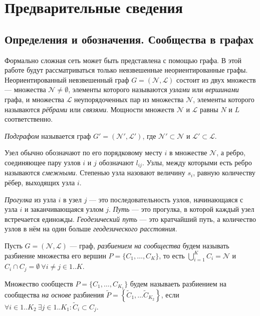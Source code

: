 \section{Предварительные сведения}
\label{sec:intro}


\subsection{Определения и обозначения. Сообщества в графах}

Формально сложная сеть может быть представлена с помощью графа. В этой работе будут рассматриваться только невзвешенные неориентированные графы. Неориентированный невзвешенный граф $G = (\mathscr{N}, \mathscr{L})$ состоит из двух множеств --- множества $\mathscr{N} \ne \emptyset$, элементы которого называются \emph{узлами} или \emph{вершинами} графа, и множества $\mathscr{L}$ неупорядоченных пар из множества $\mathscr{N}$, элементы которого называются \emph{рёбрами} или \emph{связями}. Мощности множеств $\mathscr{N}$ и $\mathscr{L}$ равны $N$ и $L$ соответственно.

\emph{Подграфом} называется граф $G' = (\mathscr{N}', \mathscr{L}')$, где $\mathscr{N}' \subset \mathscr{N}$ и $\mathscr{L}' \subset \mathscr{L}$.

Узел обычно обозначают по его порядковому месту $i$ в множестве $\mathscr{N}$, а ребро, соединяющее пару узлов $i$ и $j$ обозначают $l_{ij}$. Узлы, между которыми есть ребро называются \emph{смежными}. Степенью узла назовают величину $s_i$, равную количеству рёбер, выходящих узла $i$.

\emph{Прогулка} из узла $i$ в узел $j$ --- это последовательность узлов, начинающаяся с узла $i$ и заканчивающаяся узлом $j$. \emph{Путь} --- это прогулка, в которой каждый узел встречается единожды. \emph{Геодезический путь} --- это кратчайший путь, а количество узлов в нём на один больше \emph{геодезического расстояния}.

Пусть $G = (\mathscr{N}, \mathscr{L})$ --- граф, \emph{разбиением на сообщества} будем называть разбиение множества его вершин $P = \{C_1, \dots, C_K\}$, то есть $\bigcup_{i = 1}^K C_i = \mathscr{N}$ и $C_i \cap C_j = \emptyset \ \forall i \neq j \in 1..K$.

Множество сообществ $P = \{C_1, \dots, C_{K_1}\}$ будем называеть разбиением на сообщества \emph{на основе} разбиения $\widetilde{P} = \left\{\widetilde{C}_1, \dots \widetilde{C}_{K_2}\right\}$, если $\forall i \in 1..K_2\ \exists j \in 1..K_1: \widetilde{C}_i \subset C_j$.

